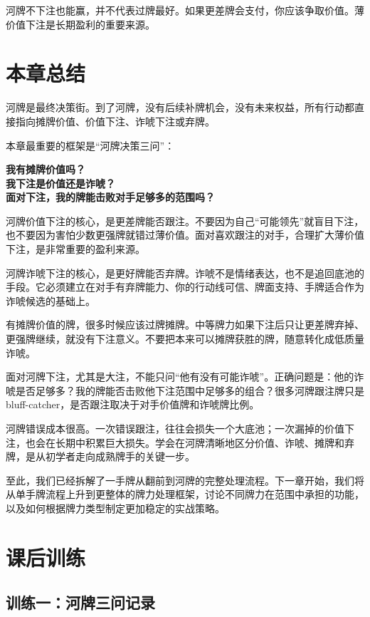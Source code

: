 河牌不下注也能赢，并不代表过牌最好。如果更差牌会支付，你应该争取价值。薄价值下注是长期盈利的重要来源。

\section{本章总结}

河牌是最终决策街。到了河牌，没有后续补牌机会，没有未来权益，所有行动都直接指向摊牌价值、价值下注、诈唬下注或弃牌。

本章最重要的框架是“河牌决策三问”：

\begin{center}
\textbf{我有摊牌价值吗？\\
我下注是价值还是诈唬？\\
面对下注，我的牌能击败对手足够多的范围吗？}
\end{center}

河牌价值下注的核心，是更差牌能否跟注。不要因为自己“可能领先”就盲目下注，也不要因为害怕少数更强牌就错过薄价值。面对喜欢跟注的对手，合理扩大薄价值下注，是非常重要的盈利来源。

河牌诈唬下注的核心，是更好牌能否弃牌。诈唬不是情绪表达，也不是追回底池的手段。它必须建立在对手有弃牌能力、你的行动线可信、牌面支持、手牌适合作为诈唬候选的基础上。

有摊牌价值的牌，很多时候应该过牌摊牌。中等牌力如果下注后只让更差牌弃掉、更强牌继续，就没有下注意义。不要把本来可以摊牌获胜的牌，随意转化成低质量诈唬。

面对河牌下注，尤其是大注，不能只问“他有没有可能诈唬”。正确问题是：他的诈唬是否足够多？我的牌能否击败他下注范围中足够多的组合？很多河牌跟注牌只是 bluff-catcher，是否跟注取决于对手价值牌和诈唬牌比例。

河牌错误成本很高。一次错误跟注，往往会损失一个大底池；一次漏掉的价值下注，也会在长期中积累巨大损失。学会在河牌清晰地区分价值、诈唬、摊牌和弃牌，是从初学者走向成熟牌手的关键一步。

至此，我们已经拆解了一手牌从翻前到河牌的完整处理流程。下一章开始，我们将从单手牌流程上升到更整体的牌力处理框架，讨论不同牌力在范围中承担的功能，以及如何根据牌力类型制定更加稳定的实战策略。

\section{课后训练}

\subsection*{训练一：河牌三问记录}

